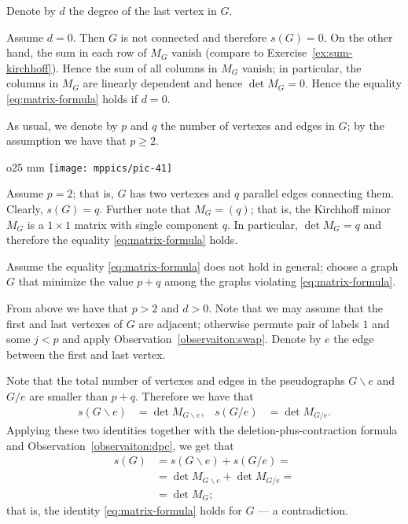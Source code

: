 Denote by $d$ the degree of the last vertex in $G$.

Assume $d=0$.
Then $G$ is not connected and therefore $s(G)=0$.
On the other hand, the sum in each row of $M_G$ vanish (compare to Exercise~\ref{ex:sum-kirchhoff}).
Hence the sum of all columns in $M_G$ vanish;
in particular, the columns in $M_G$ are linearly dependent and hence $\det M_G=0$.
Hence the equality \ref{eq:matrix-formula} holds if $d=0$.

As usual, we denote by $p$ and $q$ the number of vertexes and edges in $G$; by the assumption we have that $p\ge 2$.

\begin{wrapfigure}{o}{25 mm}
\vskip0mm
\centering
\texttt{[image: mppics/pic-41]}
\end{wrapfigure}

Assume $p=2$; that is, $G$ has two vertexes and $q$ parallel edges connecting them.
Clearly, $s(G)=q$.
Further note that $M_G=(q)$; that is,  the Kirchhoff minor $M_G$ is a $1{\times}1$ matrix with single component $q$.
In particular, $\det M_G=q$ and therefore the equality \ref{eq:matrix-formula} holds.

Assume the equality \ref{eq:matrix-formula} does not hold in general;
choose a graph $G$ that minimize the value $p+q$ among the graphs violating \ref{eq:matrix-formula}.

From above we have that $p>2$ and $d>0$.
Note that we may assume that the first and last vertexes of $G$ are adjacent;
otherwise permute pair of labels $1$ and some $j<p$  and apply Observation~\ref{observaiton:swap}.
Denote by $e$ the edge between the first and last vertex.

Note that the total number of vertexes and edges in the pseudographs $G\backslash e$ and $G/e$ are smaller than $p+q$.
Therefore we have that
\begin{align*}
s(G\backslash e)&=\det M_{G\backslash e},
&
s(G/e)&=\det M_{G/e}.
\end{align*}
Applying these two identities together with the deletion-plus-contraction formula 
and Observation~\ref{observaiton:dpc}, we get that
\begin{align*}
s(G)&=s(G\backslash e)+s(G/e)=
\\
&=\det M_{G\backslash e}+\det M_{G/e}=
\\
&=\det M_G;
\end{align*}
that is, the identity \ref{eq:matrix-formula} holds for $G$ --- a contradiction.
\qeds


